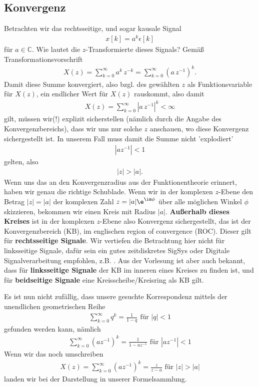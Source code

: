 \subsection*{Konvergenz}
Betrachten wir das rechtsseitige, und sogar kausale Signal
\begin{align}
x[k] = a^k \epsilon[k]
\end{align}
für $a\in\mathbb{C}$.
%
Wie lautet die $z$-Transformierte dieses Signals? Gemäß Transformationsvorschrift
\begin{align}
X(z) = \sum_{k=0}^{\infty} a^k \, z^{-k} = \sum_{k=0}^{\infty} (a \, z^{-1})^k.
\end{align}
Damit diese Summe konvergiert, also bzgl. des gewählten $z$ als Funktionsvariable für $X(z)$,
ein endlicher Wert für $X(z)$ rauskommt, also damit
\begin{align}
X(z) = \sum_{k=0}^{\infty} |a \, z^{-1}|^k < \infty
\end{align}
gilt, müssen wir(!) explizit sicherstellen (nämlich durch die Angabe des
Konvergenzbereichs), dass wir uns nur solche $z$ anschauen, wo diese Konvergenz
sichergestellt ist. In unserem Fall muss damit die Summe nicht 'explodiert'
\begin{align}
|a z^{-1}| < 1
\end{align}
gelten, also
\begin{align}
|z| > |a|.
\end{align}
%
Wenn uns das an den Konvergenzradius aus der Funktionentheorie erinnert,
haben wir genau die richtige Schublade.
%
Wenn wir in der komplexen $z$-Ebene den Betrag $|z|=|a|$
der komplexen Zahl $z = |a| \e^{\im\phi}$ über alle möglichen Winkel $\phi$
skizzieren, bekommen wir einen Kreis mit Radius $|a|$.
\textbf{Außerhalb dieses Kreises}
ist in der komplexen $z$-Ebene also Konvergenz sichergestellt, das ist der Konvergenzbereich (KB), im englischen region of convergence (ROC).
Dieser gilt für \textbf{rechtsseitige Signale}. Wir vertiefen die Betrachtung
hier nicht für linksseitige Signale, dafür sein ein gutes zeitdiskretes SigSys oder Digitale Signalverarbeitung
empfohlen, z.B. \cite{Oppenheim2004,Oppenheim2010,Kammeyer2002,Holton21}.
%
Aus der Vorlesung ist aber auch bekannt, dass für \textbf{linksseitige Signale}
der KB im inneren eines Kreises zu finden ist, und für \textbf{beidseitige Signale}
eine Kreisscheibe/Kreisring als KB gilt.

Es ist nun nicht zufällig, dass unsere gesuchte
Korrespondenz mittels der unendlichen geometrischen Reihe
\begin{align}
\label{eq:ex_09_geo_reihe}
\sum_{k=0}^\infty q^k = \frac{1}{1-q}\text{ für }|q|<1
\end{align}
gefunden werden kann, nämlich
\begin{align}
\sum_{k=0}^\infty (a z^{-1})^k = \frac{1}{1-a z^{-1}}\text{ für }|a z^{-1}|<1
\end{align}
Wenn wir das noch umschreiben
\begin{align}
X(z) = \sum_{k=0}^\infty (a z^{-1})^k = \frac{z}{z-a}\text{ für } |z|>|a|
\end{align}
landen wir bei der Darstellung in unserer Formelsammlung.
%

